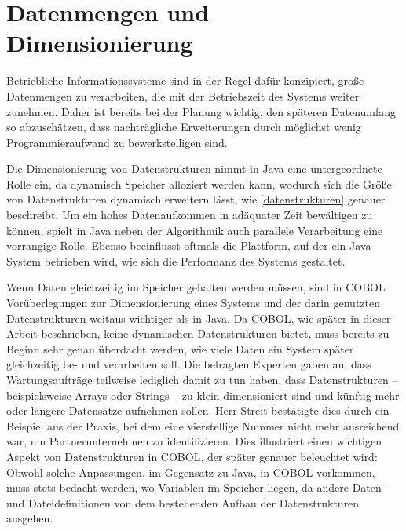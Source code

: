 \section{Datenmengen und Dimensionierung}

Betriebliche Informationssysteme sind in der Regel dafür konzipiert, große Datenmengen zu verarbeiten, die \idR mit der Betriebszeit des Systems weiter zunehmen. Daher ist bereits bei der Planung wichtig, den späteren Datenumfang so abzuschätzen, dass nachträgliche Erweiterungen durch möglichst wenig Programmieraufwand zu bewerkstelligen sind.

Die Dimensionierung von Datenstrukturen nimmt in Java eine untergeordnete Rolle ein, da dynamisch Speicher alloziert werden kann, wodurch sich die Größe von Datenstrukturen dynamisch erweitern lässt, wie \autoref{datenstrukturen} genauer beschreibt. Um ein hohes Datenaufkommen in adäquater Zeit bewältigen zu können, spielt in Java neben der Algorithmik auch parallele Verarbeitung eine vorrangige Rolle. Ebenso beeinflusst oftmals die Plattform, auf der ein Java-System betrieben wird, wie sich die Performanz des Systems gestaltet.

Wenn Daten gleichzeitig im Speicher gehalten werden müssen, sind in COBOL Vorüberlegungen zur Dimensionierung eines Systems und der darin genutzten Datenstrukturen weitaus wichtiger als in Java. Da COBOL, wie später in dieser Arbeit beschrieben, keine dynamischen Datenstrukturen bietet, muss bereits zu Beginn sehr genau überdacht werden, wie viele Daten ein System später gleichzeitig be- und verarbeiten soll. Die befragten Experten gaben an, dass Wartungsaufträge teilweise lediglich damit zu tun haben, dass Datenstrukturen -- beispielsweise Arrays oder Strings -- zu klein dimensioniert sind und künftig mehr oder längere Datensätze aufnehmen sollen. Herr Streit bestätigte dies durch ein Beispiel aus der Praxis, bei dem eine vierstellige Nummer nicht mehr ausreichend war, um Partnerunternehmen zu identifizieren.  Dies illustriert einen wichtigen Aspekt von Datenstrukturen in COBOL, der später genauer beleuchtet wird: Obwohl solche Anpassungen, im Gegensatz zu Java, in COBOL vorkommen, muss stets bedacht werden, wo Variablen im Speicher liegen, da andere Daten- und Dateidefinitionen von dem bestehenden Aufbau der Datenstrukturen ausgehen.
